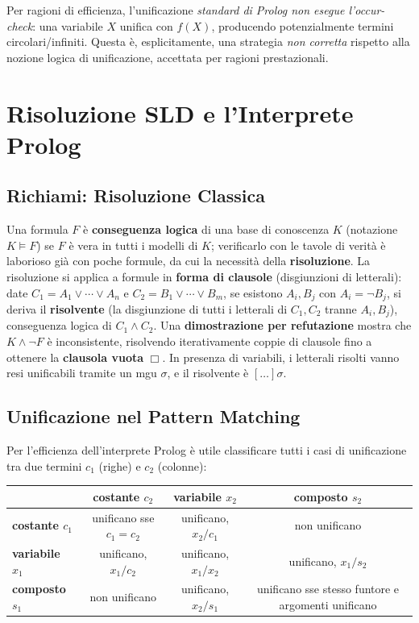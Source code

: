 \documentclass[a4paper,11pt]{article}
\begin{document}
Per ragioni di efficienza, l'unificazione \emph{standard di Prolog non esegue l'occur-check}: una variabile $X$ unifica con $f(X)$, producendo potenzialmente termini circolari/infiniti. Questa è, esplicitamente, una strategia \emph{non corretta} rispetto alla nozione logica di unificazione, accettata per ragioni prestazionali.

\newpage
\section{Risoluzione SLD e l'Interprete Prolog}

\subsection{Richiami: Risoluzione Classica}

Una formula $F$ è \textbf{conseguenza logica} di una base di conoscenza $K$ (notazione $K\models F$) se $F$ è vera in tutti i modelli di $K$; verificarlo con le tavole di verità è laborioso già con poche formule, da cui la necessità della \textbf{risoluzione}. La risoluzione si applica a formule in \textbf{forma di clausole} (disgiunzioni di letterali): date $C_1=A_1\vee\cdots\vee A_n$ e $C_2=B_1\vee\cdots\vee B_m$, se esistono $A_i,B_j$ con $A_i=\neg B_j$, si deriva il \textbf{risolvente} (la disgiunzione di tutti i letterali di $C_1,C_2$ tranne $A_i,B_j$), conseguenza logica di $C_1\wedge C_2$. Una \textbf{dimostrazione per refutazione} mostra che $K\wedge\neg F$ è inconsistente, risolvendo iterativamente coppie di clausole fino a ottenere la \textbf{clausola vuota} $\Box$. In presenza di variabili, i letterali risolti vanno resi unificabili tramite un mgu $\sigma$, e il risolvente è $[\ldots]\sigma$.

\subsection{Unificazione nel Pattern Matching}

Per l'efficienza dell'interprete Prolog è utile classificare tutti i casi di unificazione tra due termini $c_1$ (righe) e $c_2$ (colonne):

\begin{center}
\small
\begin{tabular}{lccc}
\toprule
 & \textbf{costante $c_2$} & \textbf{variabile $x_2$} & \textbf{composto $s_2$} \\
\midrule
\textbf{costante $c_1$} & unificano sse $c_1{=}c_2$ & unificano, $x_2/c_1$ & non unificano \\
\textbf{variabile $x_1$} & unificano, $x_1/c_2$ & unificano, $x_1/x_2$ & unificano, $x_1/s_2$ \\
\textbf{composto $s_1$} & non unificano & unificano, $x_2/s_1$ & unificano sse stesso funtore e argomenti unificano \\
\bottomrule
\end{tabular}
\end{center}
\end{document}
